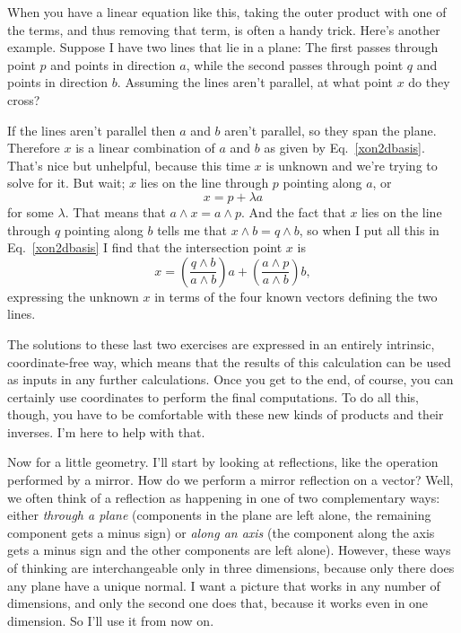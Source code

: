 \documentclass{utarticle}
\DeclareMathOperator{\out}{\wedge}
\begin{document}
When you have a linear equation like this, taking the outer product with one of the 
terms, and thus removing that term, is often a handy trick.  Here's another example.
Suppose I have two lines that lie in a plane: The first passes through point $p$ and points 
in direction $a$, while the second passes through point $q$ and points in direction $b$.
Assuming the lines aren't parallel, at what point $x$ do they cross?

If the lines aren't parallel then $a$ and $b$ aren't parallel, so they span the plane.  
Therefore $x$ is a linear combination of $a$ and $b$ as given by Eq.~\eqref{xon2dbasis}.  
That's nice but unhelpful, because this time $x$ is unknown and we're trying to solve for 
it.  But wait; $x$ lies on the line through $p$ pointing along $a$, or
\begin{equation} x = p + \lambda a \end{equation}
for some $\lambda$.  That means that $a \out x = a \out p$.  And the fact that $x$ lies 
on the line through $q$ pointing along $b$ tells me that $x \out b = q \out b$,
so when I put all this in Eq.~\eqref{xon2dbasis} I find that the intersection point $x$ is
\begin{equation}
x =   \left( \frac{q \out b}{a \out b} \right) a +  \left( \frac{a \out p}{a \out b} \right) b,
\end{equation}
expressing the unknown $x$ in terms of the four known vectors defining the two lines.

The solutions to these last two exercises are expressed in an entirely intrinsic, coordinate-free 
way, which means that the results of this calculation can be used as inputs in any further 
calculations.  Once you get to the end, of course, you can certainly use coordinates to
perform the final computations.  To do all this, though, you have to be comfortable with
these new kinds of products and their inverses.  I'm here to help with that.

Now for a little geometry.  I'll start by looking at reflections, like the operation performed 
by a mirror.  How do we perform a mirror reflection on a vector?  Well, we often think 
of a reflection as happening in one of two complementary ways:  either 
\emph{through a plane} (components in the plane are left alone, the 
remaining component gets a minus sign) or \emph{along an axis} (the 
component along the axis gets a minus sign and the other components are 
left alone).  However, these ways of thinking are interchangeable only in 
three dimensions, because only there does any plane have a unique normal.  
I want a picture that works in any number of dimensions, and only the second
one does that, because it works even in one dimension.  So I'll use it from now on.
\end{document}

